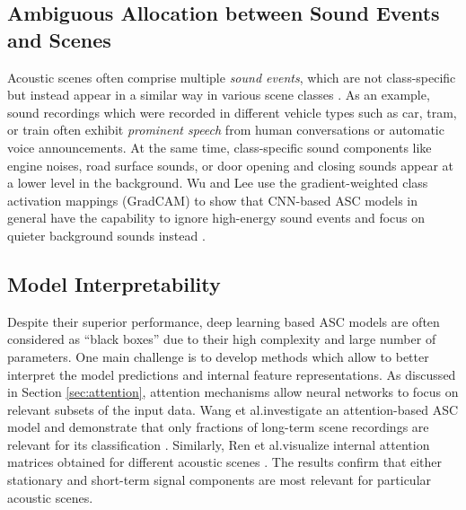 \documentclass[applsci,article,submit,oneauthor,pdftex]{Definitions/mdpi}
\makeatletter
\newcommand{\etal}{{et al}.\@ }
\newcommand{\secref}[1]{{Section \ref{#1}}}
\makeatother
\begin{document}
\subsection{Ambiguous Allocation between Sound Events and Scenes}

Acoustic scenes often comprise multiple \textit{sound events}, which are not class-specific but instead appear in a similar way in various scene classes \citep{Park:2017:DoubleImageASC:DCASE, Mesaros:2017:HumanASC:WASPAA}. 
As an example, sound recordings which were recorded in different vehicle types such as car, tram, or train often exhibit \textit{prominent speech} from human conversations or automatic voice announcements. At the same time, class-specific sound components like engine noises, road surface sounds, or door opening and closing sounds  appear at a lower level in the background.
Wu and Lee use the gradient-weighted class activation mappings (GradCAM) to show that CNN-based ASC models in general have the capability to ignore high-energy sound events and focus on quieter background sounds instead \citep{Wu:2019:SoundTexture:ICASSP}.


\subsection{Model Interpretability}

Despite their superior performance, deep learning based ASC models are often considered as ``black boxes'' due to their high complexity and large number of parameters.
One main challenge is to develop methods which allow to better interpret the model predictions and internal feature representations.
As discussed in \secref{sec:attention}, attention mechanisms allow neural networks to focus on relevant subsets of the input data.
Wang \etal investigate an attention-based ASC model and demonstrate that only fractions of long-term scene recordings are relevant for its classification \citep{Wang:2018:SelfDeterminationASC:APSIPA}.
Similarly, Ren \etal visualize internal attention matrices obtained for different acoustic scenes \citep{Ren:2019:AttrousCNNAttention:ICASSP}. The results confirm that either stationary and short-term signal components are most relevant for particular acoustic scenes. 
\end{document}
